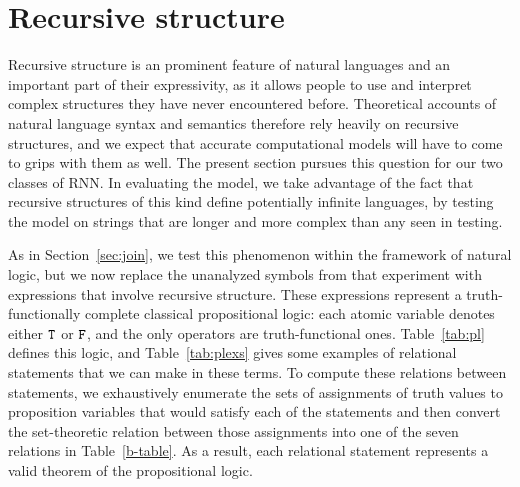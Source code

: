 \section{Recursive structure}\label{sec:recursion}

Recursive structure is an prominent feature of natural languages and
an important part of their expressivity, as it allows people to use
and interpret complex structures they have never encountered before.
Theoretical accounts of natural language syntax and semantics
therefore rely heavily on recursive structures, and we expect that
accurate computational models will have to come to grips with them as
well. The present section pursues this question for our two classes of
RNN. In evaluating the model, we take advantage of the fact that
recursive structures of this kind define potentially infinite
languages, by testing the model on strings that are longer and more
complex than any seen in testing.


As in Section~\ref{sec:join}, we test this phenomenon within the
framework of natural logic, but we now replace the unanalyzed symbols
from that experiment with expressions that involve recursive
structure. These expressions represent a truth-functionally complete classical
propositional logic: each atomic variable denotes either $\texttt{T}$ or
$\texttt{F}$, and the only operators are truth-functional ones.
Table~\ref{tab:pl} defines this logic, and Table~\ref{tab:plexs} gives
some examples of relational statements that we can make
in these terms. To compute these relations between statements, we
exhaustively enumerate the sets of assignments of truth values to
proposition variables that would satisfy each of the statements and
then convert the set-theoretic relation between those assignments into
one of the seven relations in Table~\ref{b-table}. As a result, each relational
statement represents a valid theorem of the propositional logic.


